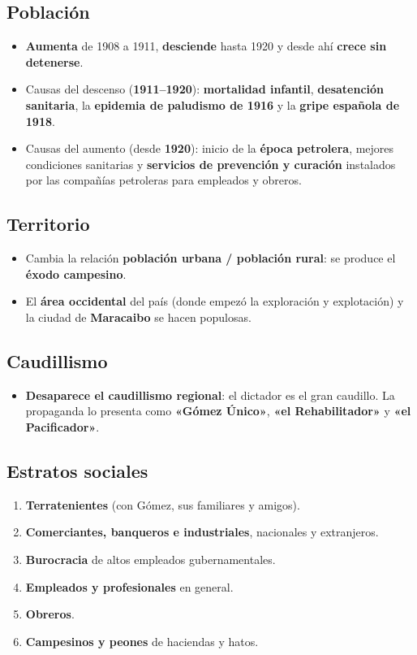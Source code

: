 \documentclass[12pt, letterpaper]{article}
\begin{document}
\subsection*{Población}
\begin{itemize}[leftmargin=*, itemsep=3pt]
  \item \textbf{Aumenta} de 1908 a 1911, \textbf{desciende} hasta 1920 y desde
        ahí \textbf{crece sin detenerse}.
  \item Causas del descenso (\textbf{1911--1920}): \textbf{mortalidad infantil},
        \textbf{desatención sanitaria}, la \textbf{epidemia de paludismo de 1916}
        y la \textbf{gripe española de 1918}.
  \item Causas del aumento (desde \textbf{1920}): inicio de la \textbf{época
        petrolera}, mejores condiciones sanitarias y \textbf{servicios de
        prevención y curación} instalados por las compañías petroleras para
        empleados y obreros.
\end{itemize}

\subsection*{Territorio}
\begin{itemize}[leftmargin=*, itemsep=3pt]
  \item Cambia la relación \textbf{población urbana / población rural}: se
        produce el \textbf{éxodo campesino}.
  \item El \textbf{área occidental} del país (donde empezó la exploración y
        explotación) y la ciudad de \textbf{Maracaibo} se hacen populosas.
\end{itemize}

\subsection*{Caudillismo}
\begin{itemize}[leftmargin=*, itemsep=3pt]
  \item \textbf{Desaparece el caudillismo regional}: el dictador es el gran
        caudillo. La propaganda lo presenta como \textbf{«Gómez Único»},
        \textbf{«el Rehabilitador»} y \textbf{«el Pacificador»}.
\end{itemize}

\subsection*{Estratos sociales}
\begin{enumerate}[leftmargin=*, itemsep=2pt]
  \item \textbf{Terratenientes} (con Gómez, sus familiares y amigos).
  \item \textbf{Comerciantes, banqueros e industriales}, nacionales y
        extranjeros.
  \item \textbf{Burocracia} de altos empleados gubernamentales.
  \item \textbf{Empleados y profesionales} en general.
  \item \textbf{Obreros}.
  \item \textbf{Campesinos y peones} de haciendas y hatos.
\end{enumerate}
\end{document}
